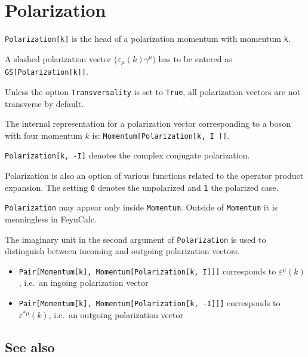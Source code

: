 \documentclass[../FeynCalcManual.tex]{subfiles}
\begin{document}
\hypertarget{polarization}{%
\section{Polarization}\label{polarization}}

\texttt{Polarization[\allowbreak{}k]} is the head of a polarization
momentum with momentum \texttt{k}.

A slashed polarization vector (\(\varepsilon_{\mu}(k) \gamma^\mu)\) has
to be entered as \texttt{GS[\allowbreak{}Polarization[\allowbreak{}k]]}.

Unless the option \texttt{Transversality} is set to \texttt{True}, all
polarization vectors are not transverse by default.

The internal representation for a polarization vector corresponding to a
boson with four momentum \(k\) is:
\texttt{Momentum[\allowbreak{}Polarization[\allowbreak{}k,\ \allowbreak{}I ]]}.

\texttt{Polarization[\allowbreak{}k,\ \allowbreak{}-I]} denotes the
complex conjugate polarization.

Polarization is also an option of various functions related to the
operator product expansion. The setting \texttt{0} denotes the
unpolarized and \texttt{1} the polarized case.

\texttt{Polarization} may appear only inside \texttt{Momentum}. Outside
of \texttt{Momentum} it is meaningless in FeynCalc.

The imaginary unit in the second argument of \texttt{Polarization} is
used to distinguish between incoming and outgoing polarization vectors.

\begin{itemize}
\item
  \texttt{Pair[\allowbreak{}Momentum[\allowbreak{}k],\ \allowbreak{}Momentum[\allowbreak{}Polarization[\allowbreak{}k,\ \allowbreak{}I]]]}
  corresponds to \(\varepsilon^{\mu}(k)\), i.e.~an ingoing polarization
  vector
\item
  \texttt{Pair[\allowbreak{}Momentum[\allowbreak{}k],\ \allowbreak{}Momentum[\allowbreak{}Polarization[\allowbreak{}k,\ \allowbreak{}-I]]]}
  corresponds to \(\varepsilon^{\ast \mu}(k)\), i.e.~an outgoing
  polarization vector
\end{itemize}

\subsection{See also}
\end{document}
